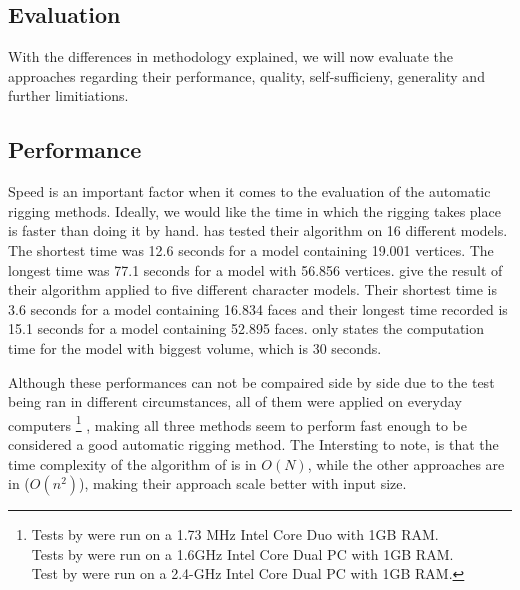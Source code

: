 \documentclass{article}
\begin{document}



\subsection{Evaluation}
With the differences in methodology explained, we will now evaluate the
approaches regarding their performance, quality, self-sufficieny, generality and
further limitiations.

\subsection{Performance}
Speed is an important factor when it comes to the evaluation of the automatic rigging
methods. Ideally, we would like the time in which the rigging takes place is
faster than doing it by hand. \citep{paper1} has tested their algorithm on 16
different models. The shortest time was 12.6 seconds for a model containing 19.001
vertices. The longest time was 77.1 seconds for a model with 56.856 vertices.
\citep{paper2} give the result of their algorithm applied to five different
character models. Their shortest time is 3.6 seconds for a model containing
16.834 faces and their longest time recorded is 15.1 seconds for a model
containing 52.895 faces.
\citep{paper3} only states the computation time for the model with biggest
volume, which is 30 seconds.

Although these performances can not be compaired side by side due to the test
being ran in different circumstances, all of them were applied on everyday
computers \footnote{Tests by \citep{paper1} were run on a 1.73 MHz Intel Core Duo
with 1GB RAM.\\ Tests by \citep{paper2} were run on a 1.6GHz Intel Core Dual PC
with 1GB RAM.\\
Test by \citep{paper3} were run on a 2.4-GHz Intel Core Dual PC with 1GB RAM.}
, making all three methods seem to perform fast enough to be considered
 a good automatic rigging method. The Intersting to note, is that the time
 complexity of the algorithm of \citep{paper2} is in $O(N)$, while the other
 approaches are in ($O(n^2)$), making their approach scale better with input
 size.
\end{document}
